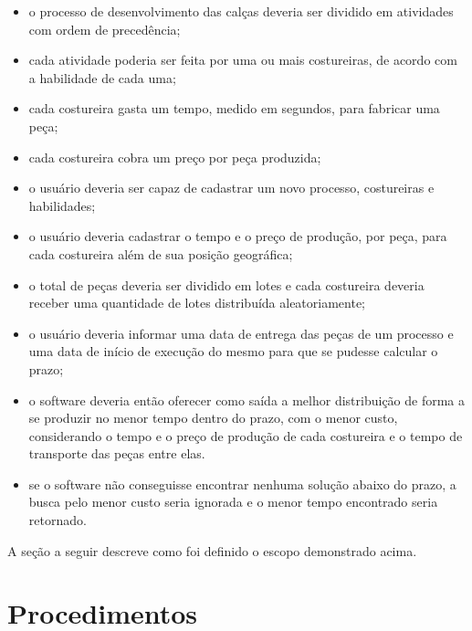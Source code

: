 \begin{itemize}
	
	\item o processo de desenvolvimento das calças deveria ser dividido em
	atividades com ordem de precedência;
	
	\item cada atividade poderia ser feita por uma ou mais costureiras, de acordo
	com a habilidade de cada uma;
	
	\item cada costureira gasta um tempo, medido em segundos, para fabricar uma
	peça;
	
	\item cada costureira cobra um preço por peça produzida;
	
	\item o usuário deveria ser capaz de cadastrar um novo processo, costureiras e
	habilidades;
	
	\item o usuário deveria cadastrar o tempo e o preço de produção, por peça, para
	cada costureira além de sua posição geográfica; 
	
	\item o total de peças deveria ser dividido em lotes e cada costureira deveria
	receber uma quantidade de lotes distribuída aleatoriamente;
	
	\item o usuário deveria informar uma data de entrega das peças de um processo e
	uma data de início de execução do mesmo para que se pudesse calcular o prazo;
	
	\item o software deveria então oferecer como saída a melhor distribuição de
	forma a se produzir no menor tempo dentro do prazo, com o menor custo, considerando 
	o tempo e o preço de produção de cada costureira e o tempo de transporte das peças 
	entre elas.
	
	\item se o software não conseguisse encontrar nenhuma solução abaixo do prazo, a
	busca pelo menor custo seria ignorada e o menor tempo encontrado seria retornado.
	
\end{itemize}

\par A seção a seguir descreve como foi definido o escopo demonstrado acima.

\section{Procedimentos}

